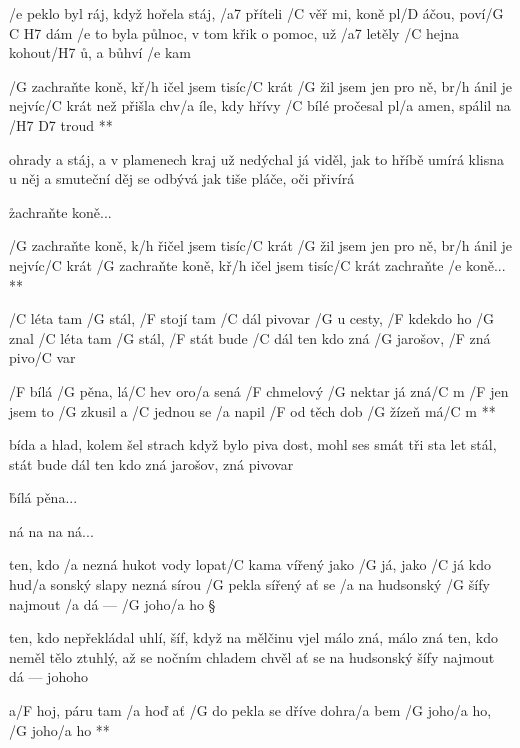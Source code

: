 \rr




/e peklo byl ráj, když hořela stáj, /a7 příteli
/C věř mi, koně pl/D áčou, poví/{G C H7} dám
/e to byla půlnoc, v tom křik o pomoc, už /a7 letěly
/C hejna kohout/H7 ů, a bůhví /e kam

\R  /G zachraňte koně, kř/h ičel jsem tisíc/C krát
    /G žil jsem jen pro ně, br/h ánil je nejvíc/C krát
    než přišla chv/a íle, kdy hřívy /C bílé
    pročesal pl/a amen, spálil na /{H7 D7} troud **

ohrady a stáj, a v plamenech kraj už nedýchal
já viděl, jak to hříbě umírá
klisna u něj a smuteční děj se odbývá
jak tiše pláče, oči přivírá

\r zachraňte koně...

\R  /G zachraňte koně, k/h řičel jsem tisíc/C krát
    /G žil jsem jen pro ně, br/h ánil je nejvíc/C krát
    /G zachraňte koně, kř/h ičel jsem tisíc/C krát
    zachraňte /e koně... **




/C léta tam /G stál, /F stojí tam /C dál
pivovar /G u cesty, /F kdekdo ho /G znal
/C léta tam /G stál, /F stát bude /C dál
ten kdo zná /G jarošov, /F zná pivo/C var

\R  /F bílá /G pěna, lá/C hev oro/a sená
    /F chmelový /G nektar já zná/C m
    /F jen jsem to /G zkusil a /C jednou se /a napil
    /F od těch dob /G žízeň má/C m **

bída a hlad, kolem šel strach
když bylo piva dost, mohl ses smát
tři sta let stál, stát bude dál
ten kdo zná jarošov, zná pivovar

\r  bílá pěna...

ná na na ná...

\rr

\rr




ten, kdo /a nezná hukot vody lopat/C kama vířený
jako /G já, jako /C já
kdo hud/a sonský slapy nezná sírou /G pekla sířený
ať se /a na hudsonský /G šífy najmout /a dá --- /G joho/a ho \S

ten, kdo nepřekládal uhlí, šíf, když na mělčinu vjel
málo zná, málo zná
ten, kdo neměl tělo ztuhlý, až se nočním chladem chvěl
ať se na hudsonský šífy najmout dá --- johoho

\R  a/F hoj, páru tam /a hoď
    ať /G do pekla se dříve dohra/a bem
    /G joho/a ho, /G joho/a ho **

